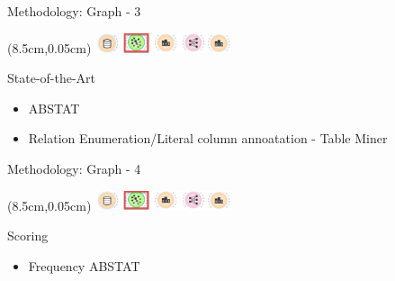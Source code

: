\documentclass{beamer}
\begin{document}
\begin{frame}{Methodology: Graph - 3}
	\begin{textblock*}{4cm}(8.5cm,0.05cm) %
		\includegraphics[width=4cm]{images/header-graph.png}
	\end{textblock*}
	State-of-the-Art
	\begin{itemize}
		\item ABSTAT
		\item Relation Enumeration/Literal column annoatation - Table Miner
	\end{itemize}
\end{frame}
\begin{frame}{Methodology: Graph - 4}
	\begin{textblock*}{4cm}(8.5cm,0.05cm) %
		\includegraphics[width=4cm]{images/header-graph.png}
	\end{textblock*}
	Scoring
	\begin{itemize}
		\item Frequency ABSTAT
	\end{itemize}
\end{frame}
\end{document}
